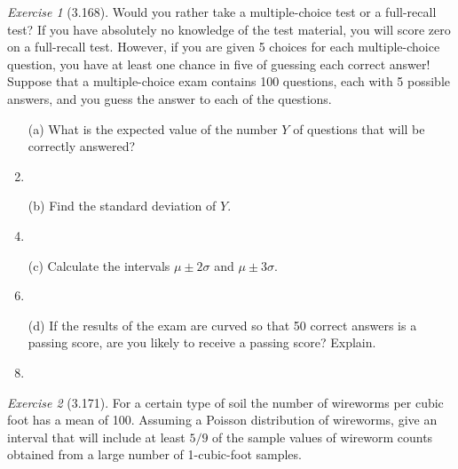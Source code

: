 \documentclass[12pt]{amsart}
\makeatletter
\theoremstyle{remark}
\newtheorem*{exercise}{Exercise}%
\renewenvironment{proof}[1][\proofname]{\par\doublespacing
  \pushQED{\qed}%
  \normalfont \topsep6\p@\@plus6\p@\relax
  \list{}{%
    \settowidth{\leftmargin}{\itshape\proofname:\hskip\labelsep}%
    \setlength{\labelwidth}{0pt}%
    \setlength{\itemindent}{-\leftmargin}%
  }%
  \item[\hskip\labelsep\itshape#1\@addpunct{:}]\ignorespaces
}{%
  \popQED\endlist\@endpefalse
  \singlespacing
}
\theoremstyle{mycomment}
\makeatother
\begin{document}
\begin{exercise}[3.168]
Would you rather take a multiple-choice test or a full-recall test? If you have absolutely no knowledge of the test material, you will score zero on a full-recall test. However, if you are given 5 choices for each multiple-choice question, you have at least one chance in five of guessing each correct answer! Suppose that a multiple-choice exam contains 100 questions, each with 5 possible answers, and you guess the answer to each of the questions.

\begin{enumerate}
    \item[(a)] What is the expected value of the number $Y$ of questions that will be correctly answered?
\begin{proof}[Solution]
 
\end{proof}
    \item[(b)] Find the standard deviation of $Y$.
\begin{proof}[Solution]
 
\end{proof}
    \item[(c)] Calculate the intervals $\mu \pm 2\sigma$ and $\mu \pm 3\sigma$.
\begin{proof}[Solution]
 
\end{proof}
    \item[(d)] If the results of the exam are curved so that 50 correct answers is a passing score, are you likely to receive a passing score? Explain.
\begin{proof}[Solution]
 
\end{proof}
\end{enumerate} 
\end{exercise}

\begin{exercise}[3.171]
For a certain type of soil the number of wireworms per cubic foot has a mean of 100. Assuming a Poisson distribution of wireworms, give an interval that will include at least $5/9$ of the sample values of wireworm counts obtained from a large number of 1-cubic-foot samples.

\begin{proof}[Solution]
 
\end{proof}
\end{exercise}
\end{document}

